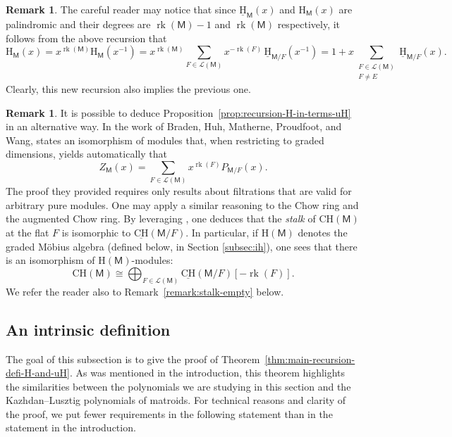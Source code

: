\documentclass[11pt, a4paper, english]{amsart}
\theoremstyle{teoremas}
\theoremstyle{definition}
\newtheorem{remark}[theorem]{Remark}
\DeclareMathOperator{\rk}{rk}
\newcommand{\M}{\mathsf{M}}
\renewcommand{\H}{\mathrm{H}}
\newcommand{\CH}{\mathrm{CH}}
\newcommand{\uH}{\underline{\mathrm{H}}}
\newcommand{\uCH}{\underline{\mathrm{CH}}}
\begin{document}
\begin{remark}\label{remark:alternative-convolution}
    The careful reader may notice that since $\uH_{\M}(x)$ and $\H_{\M}(x)$ are palindromic and their degrees are $\rk(\M)-1$ and $\rk(\M)$ respectively, it follows from the above recursion that 
    \[ \H_{\M}(x) = x^{\rk(\M)} \H_{\M}(x^{-1}) = x^{\rk(\M)} \sum_{F\in\mathcal{L}(\M)} x^{-\rk(F)} \, \uH_{\M/F}(x^{-1}) = 1 + x \sum_{\substack{F\in\mathcal{L}(\M)\\F\neq E}} \uH_{\M/F}(x).\]
    Clearly, this new recursion also implies the previous one. 
\end{remark}

\begin{remark}
   It is possible to deduce Proposition~\ref{prop:recursion-H-in-terms-uH} in an alternative way. In the work of Braden, Huh, Matherne, Proudfoot, and Wang, \cite[Proposition~1.8]{braden-huh-matherne-proudfoot-wang} states an isomorphism of modules that, when restricting to graded dimensions, yields automatically that
    \[ Z_{\M}(x) = \sum_{F\in\mathcal{L}(\M)} x^{\rk(F)} P_{\M/F}(x).\]
   The proof they provided requires only results about filtrations that are valid for arbitrary pure modules. One may apply a similar reasoning to the Chow ring and the augmented Chow ring. By leveraging \cite[Proposition~2.15 and Lemma~5.7]{braden-huh-matherne-proudfoot-wang}, one deduces that the \emph{stalk} of $\CH(\M)$ at the flat $F$ is isomorphic to $\uCH(\M/F)$. In particular, if $\H(\M)$ denotes the graded M\"obius algebra (defined below, in Section \ref{subsec:ih}), one sees that there is an isomorphism of $\H(\M)$-modules:
    \[ \CH(\M) \cong \bigoplus_{F\in\mathcal{L}(\M)} \uCH(\M/F)[-\rk(F)].\]
    We refer the reader also to Remark~\ref{remark:stalk-empty} below.
\end{remark}

\subsection{An intrinsic definition}\label{subsec:intrinsic-definition}

The goal of this subsection is to give the  proof of Theorem~\ref{thm:main-recursion-defi-H-and-uH}. As was mentioned in the introduction, this theorem highlights the similarities between the polynomials we are studying in this section and the Kazhdan--Lusztig polynomials of matroids. For technical reasons and clarity of the proof, we put fewer requirements in the following statement than in the statement in the introduction.
\end{document}
